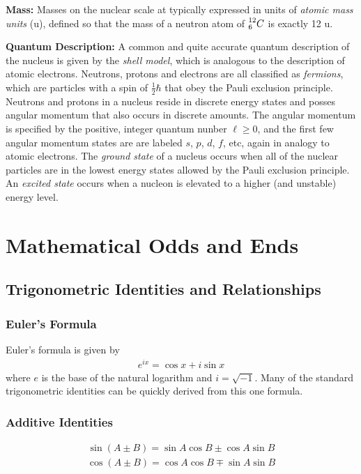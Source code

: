 \documentclass[11pt]{article}
\newcommand\leftidx[3]{{\vphantom{#2}}#1#2#3}
\begin{document}
\textbf{Mass:} Masses on the nuclear scale at typically expressed in units of \emph{atomic mass units} (u), defined so that the mass of a neutron atom of \(\leftidx{^{12}_6}{C}{}\) is exactly 12 u.

\textbf{Quantum Description:}  A common and quite accurate quantum description of the nucleus is given by the \emph{shell model}, which is analogous to the description of atomic electrons.  Neutrons, protons and electrons are all classified as \emph{fermions}, which are particles with a spin of \(\frac{1}{2}\hbar\) that obey the Pauli exclusion principle.  Neutrons and protons in a nucleus reside in discrete energy states and posses angular momentum that also occurs in discrete amounts.  The angular momentum is specified by the positive, integer quantum nunber \(\ell \geq 0\), and the first few angular momentum states are are labeled \(s\), \(p\), \(d\), \(f\), etc, again in analogy to atomic electrons.  The \emph{ground state} of a nucleus occurs when all of the nuclear particles are in the lowest energy states allowed by the Pauli exclusion principle.  An \emph{excited state} occurs when a nucleon is elevated to a higher (and unstable) energy level.

\section{Mathematical Odds and Ends}
\label{sec:orgheadline72}
\subsection{Trigonometric Identities and Relationships}
\label{sec:orgheadline64}
\subsubsection{Euler's Formula}
\label{sec:orgheadline61}
Euler's formula is given by
\begin{align}
  e^{i x} = \cos x + i \sin x
\end{align}
where \(e\) is the base of the natural logarithm and \(i = \sqrt{-1}\).  Many of the standard trigonometric identities can be quickly derived from this one formula.
\subsubsection{Additive Identities}
\label{sec:orgheadline62}
\begin{align}
  \sin\left(A \pm B\right) = \sin A \cos B \pm \cos A \sin B
\end{align}
\begin{align}
  \cos\left(A \pm B\right) = \cos A \cos B \mp \sin A \sin B
\end{align}
\end{document}
